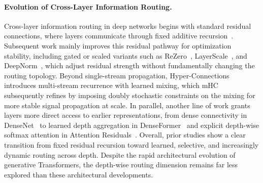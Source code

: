 \documentclass{llmxive}
\begin{document}
\paragraph{Evolution of Cross-Layer Information Routing.} Cross-layer information routing in deep networks begins with standard residual connections, where layers communicate through fixed additive recursion~\citep{he2016deep,srivastava2015highway}. Subsequent work mainly improves this residual pathway for optimization stability, including gated or scaled variants such as ReZero~\citep{bachlechner2021rezero}, LayerScale~\citep{touvron2021going}, and DeepNorm~\citep{wang2024deepnet}, which adjust residual strength without fundamentally changing the routing topology. Beyond single-stream propagation, Hyper-Connections~\citep{zhu2024hyper} introduces multi-stream recurrence with learned mixing, which mHC~\citep{xie2025mhc} subsequently refines by imposing doubly stochastic constraints on the mixing for more stable signal propagation at scale. In parallel, another line of work grants layers more direct access to earlier representations, from dense connectivity in DenseNet~\citep{huang2017densely} to learned depth aggregation in DenseFormer~\citep{pagliardini2024denseformer} and explicit depth-wise softmax attention in Attention Residuals~\citep{team2026attention}. Overall, prior studies show a clear transition from fixed residual recursion toward learned, selective, and increasingly dynamic routing across depth. Despite the rapid architectural evolution of generative Transformers, the depth-wise routing dimension remains far less explored than these architectural developments.
\end{document}
